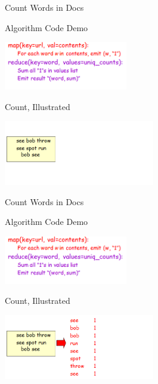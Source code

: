 \documentclass{beamer}
\begin{document}
\begin{frame}[c]{Count Words in Docs}
    \begin{block}{Algorithm Code Demo}
    \begin{center}
    \includegraphics[height=60pt]{keyan/map1.png}
    \end{center}
    \end{block}

    \begin{block}{Count, Illustrated}
    \begin{center}
    \includegraphics[height=80pt]{keyan/map2.png}
    \end{center}
    \end{block}
\end{frame}

\begin{frame}[c]{Count Words in Docs}
    \begin{block}{Algorithm Code Demo}
    \begin{center}
    \includegraphics[height=60pt]{keyan/map1.png}
    \end{center}
    \end{block}

    \begin{block}{Count, Illustrated}
    \begin{center}
    \includegraphics[height=80pt]{keyan/map2-1.png}
    \end{center}
    \end{block}
\end{frame}
\end{document}
